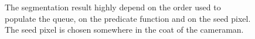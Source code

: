 \begin{figure}[htbp]
\hfill
{}
 
\caption{The segmentation result highly depend on the order used to populate the queue, on the predicate function and on the seed pixel. The seed pixel is chosen somewhere in the coat of the cameraman.}
\label{fig:regiongrowing:matlab:cameraman}
\end{figure}
